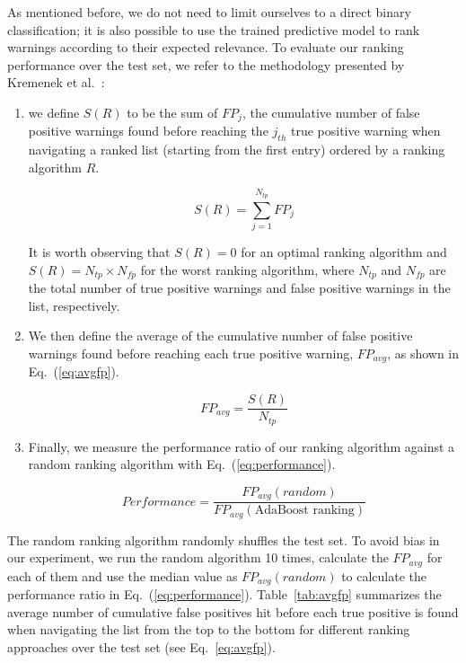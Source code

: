 As mentioned before, we do not need to limit ourselves to a direct binary
classification; it is also possible to use the trained predictive model to rank
warnings according to their expected relevance. To evaluate our ranking
performance over the test set, we refer to the methodology presented by
Kremenek et al.~\cite{kremenek2004correlation}:

\begin{enumerate}

\item we define $S(R)$ to be the
sum of $FP_j$, the cumulative number of false positive warnings found before
reaching the $j_{th}$ true positive warning when navigating a ranked list
(starting from the first entry) ordered by a ranking algorithm $R$.

\begin{equation}\label{eq:sr}
  S\left(R\right) = \sum\limits_{j=1}^{N_{tp}} \mathit{FP}_j
\end{equation}

It is worth observing that $S\left(R\right) = 0$ for an optimal ranking algorithm and
$S\left(R\right) = N_{tp} \times N_{fp}$ for the worst ranking algorithm, where $N_{tp}$
and $N_{fp}$ are the total number of true positive warnings and false positive
warnings in the list, respectively.

\item We then define the average of the cumulative number of false positive
warnings found before reaching each true positive warning, $\mathit{FP}_{avg}$, as shown
in Eq.~(\ref{eq:avgfp}).

\begin{equation}\label{eq:avgfp}
  \mathit{FP}_{avg} = \frac{S\left(R\right)}{N_{tp}}
\end{equation}

\item Finally, we measure the performance ratio of our ranking algorithm against a random
ranking algorithm with Eq.~(\ref{eq:performance}).

\begin{equation}\label{eq:performance}
  \mathit{Performance} = \frac{\mathit{FP}_{avg}(\mathit{random})}{\mathit{FP}_{avg}(\text{AdaBoost ranking})}
\end{equation}

\end{enumerate}

The random ranking algorithm randomly shuffles the test set. To avoid bias in
our experiment, we run the random algorithm 10 times, calculate the
$\mathit{FP}_{avg}$ for each of them and use the median value as
$\mathit{FP}_{avg}(\mathit{random})$ to calculate the performance ratio in
Eq.~(\ref{eq:performance}). Table~\ref{tab:avgfp} summarizes the average number
of cumulative false positives hit before each true positive is found when
navigating the list from the top to the bottom for different ranking approaches
over the test set (see Eq.~\ref{eq:avgfp}).

